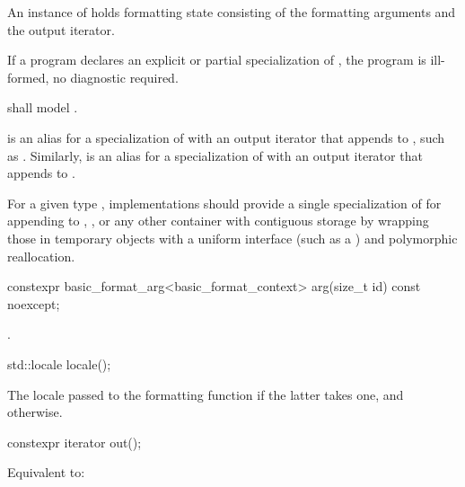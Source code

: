 \pnum
An instance of  holds formatting state
consisting of the formatting arguments and the output iterator.

\pnum
If a program declares an explicit or partial specialization of
,
the program is ill-formed, no diagnostic required.

\pnum
{} shall model .

\pnum
{}%
 is an alias for
a specialization of 
with an output iterator
that appends to ,
such as .
%
Similarly,  is an alias for
a specialization of 
with an output iterator
that appends to .

\pnum
\recommended
For a given type ,
implementations should provide
a single specialization of 
for appending to
,
,
or any other container with contiguous storage
by wrapping those in temporary objects with a uniform interface
(such as a ) and polymorphic reallocation.

%
\begin{itemdecl}
constexpr basic_format_arg<basic_format_context> arg(size_t id) const noexcept;
\end{itemdecl}

\begin{itemdescr}
\pnum
\returns
{}.
\end{itemdescr}

%
\begin{itemdecl}
std::locale locale();
\end{itemdecl}

\begin{itemdescr}
\pnum
\returns
The locale passed to the formatting function
if the latter takes one,
and  otherwise.
\end{itemdescr}

%
\begin{itemdecl}
constexpr iterator out();
\end{itemdecl}

\begin{itemdescr}
\pnum
\effects
Equivalent to: 
\end{itemdescr}

